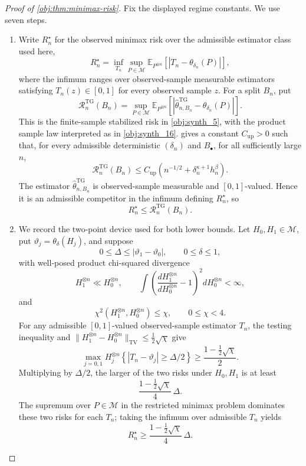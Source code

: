 \begin{proof}[Proof of \cref{obj:thm:minimax-risk}]
Fix the displayed regime constants.  We use seven steps.

\begin{enumerate}
\item Write \(R_n^\star\) for the observed minimax risk over the admissible estimator class used here,
\[
R_n^\star
=
\inf_{T_n}
\sup_{P\in\mathcal M}
\mathbb E_{P^{\otimes n}}
\left[
\left|T_n-\theta_{\delta_n}(P)\right|
\right],
\]
where the infimum ranges over observed-sample measurable estimators satisfying
\(T_n(z)\in[0,1]\) for every observed sample \(z\).  For a split \(B_n\), put
\[
\mathcal R_n^{\mathrm{TG}}(B_n)
=
\sup_{P\in\mathcal M}
\mathbb E_{P^{\otimes n}}
\left[
\left|\widehat\theta_{n,B_n}^{\mathrm{TG}}-\theta_{\delta_n}(P)\right|
\right].
\]
This is the finite-sample stabilized risk in \cref{obj:synth_5}, with the product
sample law interpreted as in \cref{obj:synth_16}.  
gives a constant \(C_{\mathrm{up}}>0\) such that, for every admissible deterministic
\((\delta_n)\) and \(B_\bullet\), for all sufficiently large \(n\),
\[
\mathcal R_n^{\mathrm{TG}}(B_n)
\le
C_{\mathrm{up}}
\left(n^{-1/2}+\delta_n^{\kappa+1}h_n^\beta\right).
\]
The estimator \(\widehat\theta_{n,B_n}^{\mathrm{TG}}\) is observed-sample measurable and
\([0,1]\)-valued. Hence it is an admissible competitor in the infimum defining
\(R_n^\star\), so
\[
R_n^\star\le \mathcal R_n^{\mathrm{TG}}(B_n).
\]

\item We record the two-point device used for both lower bounds.  Let
\(H_0,H_1\in\mathcal M\), put \(\vartheta_j=\theta_\delta(H_j)\), and suppose
\[
0\le \Delta\le |\vartheta_1-\vartheta_0|,
\qquad
0\le\delta\le1,
\]
with well-posed product chi-squared divergence
\[
H_1^{\otimes n}\ll H_0^{\otimes n},
\qquad
\int\left(\frac{dH_1^{\otimes n}}{dH_0^{\otimes n}}-1\right)^2dH_0^{\otimes n}<\infty,
\]
and
\[
\chi^2(H_1^{\otimes n},H_0^{\otimes n})\le \chi,
\qquad
0\le\chi<4 .
\]
For any admissible \([0,1]\)-valued observed-sample estimator \(T_n\), the testing
inequality and
\(\|H_1^{\otimes n}-H_0^{\otimes n}\|_{\mathrm{TV}}
\le \frac12\sqrt{\chi}\) give
\[
\max_{j=0,1}
H_j^{\otimes n}
\left\{
|T_n-\vartheta_j|\ge \Delta/2
\right\}
\ge
\frac{1-\frac12\sqrt{\chi}}{2}.
\]
Multiplying by \(\Delta/2\), the larger of the two risks under \(H_0,H_1\) is at least
\[
\frac{1-\frac12\sqrt{\chi}}{4}\,\Delta .
\]
The supremum over \(P\in\mathcal M\) in the restricted minimax problem dominates these
two risks for each \(T_n\); taking the infimum over admissible \(T_n\) yields
\[
R_n^\star
\ge
\frac{1-\frac12\sqrt{\chi}}{4}\,\Delta .
\]


\end{enumerate}
\end{proof}
